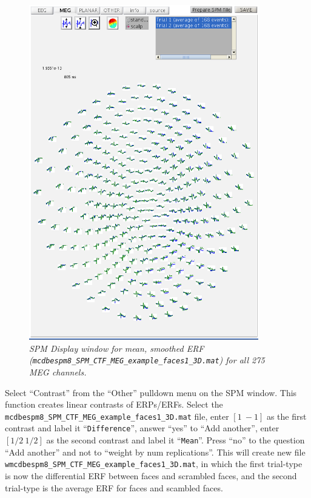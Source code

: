 \begin{figure}
\begin{center}
\includegraphics[width=100mm]{multimodal/figures/meg_scalp_erf}
\caption{\em SPM Display window for mean, smoothed ERF (\texttt{mcdbespm8\_\-SPM\_\-CTF\_\-MEG\_\-example\_\-faces1\_\-3D.mat}) for all 275 MEG channels. \label{multimodal:fig:10}}
\end{center}
\end{figure}

Select ``Contrast'' from the ``Other'' pulldown menu on the SPM window. This function creates linear contrasts of ERPs/ERFs. Select the \texttt{mcdbespm8\_SPM\_CTF\_MEG\_example\_faces1\_3D.mat} file, enter $[1\: -1]$ as the first contrast and label it ``\texttt{Difference}'', answer ``yes'' to ``Add another'',  enter $[1/2\: 1/2]$ as the second contrast and label it ``\texttt{Mean}''. Press ``no'' to the question ``Add another'' and not to ``weight by num replications''. This will create new file \texttt{wmcdbespm8\_\-SPM\_\-CTF\_\-MEG\_\-example\_\-faces1\_\-3D.mat}, in which the first trial-type is now the differential ERF between faces and scrambled faces, and the second trial-type is the average ERF for faces and scambled faces.

